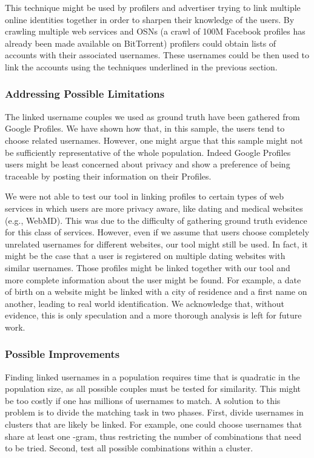 \documentclass[letterpaper]{sig-alternate}
\begin{document}
This technique might be used by profilers and advertiser trying to
link multiple online identities together in order to sharpen their knowledge
of the users. By crawling multiple web services and OSNs (a crawl of 100M Facebook
profiles has already been made available on BitTorrent) profilers could obtain lists of 
accounts with their associated usernames. These usernames could be then used to
link the accounts using the techniques underlined in the previous section.

\subsubsection{Addressing Possible Limitations}

The linked username couples we used as ground truth have been gathered from Google Profiles.
We have shown how that, in this sample, the users tend to choose related usernames.
However, one might argue that this sample might not be sufficiently representative of
the whole population. Indeed Google Profiles users might be least 
concerned about privacy and show a preference of being traceable by
posting their information on their Profiles.

We were not able to test our tool in linking profiles to certain types of web
services in which users are more privacy aware, like dating and medical
websites (e.g., WebMD).  This was due to the difficulty of gathering ground
truth evidence for this class of services.  However, even if we assume that
users choose completely unrelated usernames for different websites, our tool might
still be used.  In fact, it might be the case that a user is registered on
multiple dating websites with similar usernames.  Those profiles might be
linked together with our tool and more complete information about the user
might be found. For example, a date of birth on a website might be linked
with a city of residence and a first name on another, leading to real world
identification.
We acknowledge that, without evidence, this is only speculation and
a more thorough analysis is left for future work.

\subsubsection{Possible Improvements}

Finding linked usernames in a population requires time that is quadratic in the
population size, as all possible couples must be tested for similarity.
This might be too costly if one has millions of usernames to
match. 
A solution to this problem is to divide the matching task in two phases. First, divide
usernames in clusters that are likely be linked.  For example, one could choose
usernames that share at least one -gram, thus restricting the number of
combinations that need to be tried.  Second, test all possible
combinations within a cluster.  
\end{document}
